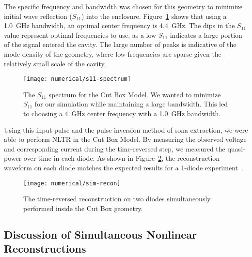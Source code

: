 The specific frequency and bandwidth was chosen for this geometry to minimize initial wave reflection ($S_{11}$) into the enclosure. Figure~\ref{fig:numerical-s11-spectrum} shows that using a 1.0~GHz bandwidth, an optimal center frequency is 4.4~GHz. The dips in the $S_{11}$ value represent optimal frequencies to use, as a low $S_{11}$ indicates a large portion of the signal entered the cavity. The large number of peaks is indicative of the mode density of the geometry, where low frequencies are sparse given the relatively small scale of the cavity.

\begin{figure}[t]
\centering
\texttt{[image: numerical/s11-spectrum]}
\caption[$S_{11}$ spectrum of the Cut Box Model]{The $S_{11}$ spectrum for the Cut Box Model. We wanted to minimize $S_{11}$ for our simulation while maintaining a large bandwidth. This led to choosing a 4~GHz center frequency with a 1.0~GHz bandwidth.}
\label{fig:numerical-s11-spectrum}
\end{figure}

Using this input pulse and the pulse inversion method of sona extraction, we were able to perform NLTR in the Cut Box Model. By measuring the observed voltage and corresponding current during the time-reversed step, we measured the quasi-power over time in each diode. As shown in Figure~\ref{fig:numerical-sim-recon}, the reconstruction waveform on each diode matches the expected results for a 1-diode experiment~\cite{taddese_sensing_2010,barbieri_time_2010}.
\begin{figure}[t]
\centering
\texttt{[image: numerical/sim-recon]}
\caption[Simultaneous reconstructions on two diodes]{The time-reversed reconstruction on two diodes simultaneously performed inside the Cut Box geometry.}
\label{fig:numerical-sim-recon}
\end{figure}

\subsection{Discussion of Simultaneous Nonlinear Reconstructions}

